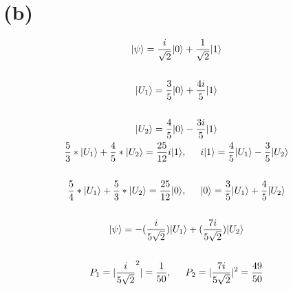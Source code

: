 \documentclass[a4paper, 12pt]{article}
\begin{document}
\section*{\small(b)}
\begin{gather*}
    |\psi\rangle = \frac{i}{\sqrt{2}}|0\rangle + \frac{1}{\sqrt{2}}|1\rangle\\~\\
    |U_1\rangle = \frac{3}{5}|0\rangle + \frac{4i}{5}|1\rangle\\~\\
    |U_2\rangle = \frac{4}{5}|0\rangle - \frac{3i}{5}|1\rangle\\
    \frac{5}{3} * |U_1\rangle + \frac{4}{5} * |U_2\rangle = \frac{25}{12}i|1\rangle, \hspace{0.5cm}i|1\rangle = \frac{4}{5}|U_1\rangle - \frac{3}{5}|U_2\rangle\\~\\
    \frac{5}{4} * |U_1\rangle + \frac{5}{3} * |U_2\rangle = \frac{25}{12}|0\rangle,  \hspace{0.5cm}|0\rangle = \frac{3}{5}|U_1\rangle + \frac{4}{5}|U_2\rangle \\~\\
|\psi\rangle = -(\frac{i}{5\sqrt{2}})|U_1\rangle +  (\frac{7i}{5\sqrt{2}})|U_2\rangle\\~\\
P_1 = |\frac{i}{5\sqrt{2}}^2| = \frac{1}{50}, \hspace{0.5cm}
P_2 = |\frac{7i}{5\sqrt{2}}|^2 = \frac{49}{50}
\end{gather*}
\end{document}

